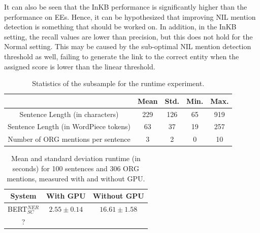 \documentclass{report}
\theoremstyle{definition}
\theoremstyle{remark}
\begin{document}
It can also be seen that the InKB performance is significantly higher than the performance on EEs. Hence, it can be hypothesized that improving NIL mention detection is something that should be worked on. In addition, in the InKB setting, the recall values are lower than precision, but this does not hold for the Normal setting. This may be caused by the sub-optimal NIL mention detection threshold as well, failing to generate the link to the correct entity when the assigned score is lower than the linear threshold.

\begin{table}
    \centering
    \begin{tabular}{c|cccc}
    &  Mean & Std. & Min. & Max.\\
    \hline
    Sentence Length (in characters) &  229 & 126 & 65 & 919\\
    Sentence Length (in WordPiece tokens) & 63 & 37 & 19 & 257\\
    Number of ORG mentions per sentence & 3 & 2 & 0 & 10\\
    \end{tabular}
    \caption{Statistics of the subsample for the runtime experiment.}
    \label{tab:efficiencystats}
\end{table}

\begin{table}
    \centering
    \begin{tabular}{c|cc}
    System   & With GPU & Without GPU  \\
    \hline
    BERT$_{SC}^{NER}$  & $2.55 \pm 0.14$ & $16.61 \pm 1.58$\\
    ?  & \\
    \end{tabular}
    \caption{Mean and standard deviation runtime (in seconds) for 100 sentences and 306 ORG mentions, measured with and without GPU.}
    \label{tab:efficiencyresults}
\end{table}
\end{document}
